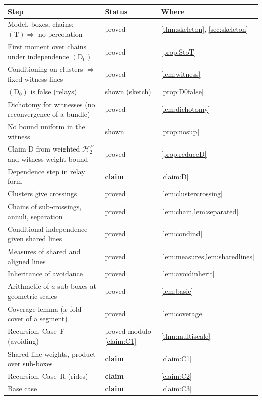 \documentclass[11pt,letterpaper]{article}
\begin{document}
\begin{center}
\renewcommand{\arraystretch}{1.25}
\begin{tabular}{@{}p{}p{}p{}@{}}
\toprule
Step & Status & Where \\
\midrule
Model, boxes, chains; $\mathrm{(T)}\Rightarrow$ no percolation & proved & \cref{thm:skeleton}, \cref{sec:skeleton} \\
First moment over chains under independence $\mathrm{(D_0)}$ & proved & \cref{prop:StoT} \\
Conditioning on clusters $\Rightarrow$ fixed witness lines & proved & \cref{lem:witness} \\
$\mathrm{(D_0)}$ is false (relays) & shown (sketch) & \cref{prop:D0false} \\
Dichotomy for witnesses (no reconvergence of a bundle) & proved & \cref{lem:dichotomy} \\
No bound uniform in the witness & shown & \cref{prop:nosup} \\
Claim D from weighted $\mathcal H_2^E$ and witness weight bound & proved & \cref{prop:reduceD} \\
Dependence step in relay form & \textbf{claim} & \cref{claim:D} \\
Clusters give crossings & proved & \cref{lem:clustercrossing} \\
Chains of sub-crossings, annuli, separation & proved & \cref{lem:chain,lem:separated} \\
Conditional independence given shared lines & proved & \cref{lem:condind} \\
Measures of shared and aligned lines & proved & \cref{lem:measures,lem:sharedlines} \\
Inheritance of avoidance & proved & \cref{lem:avoidinherit} \\
Arithmetic of $a$ sub-boxes at geometric scales & proved & \cref{lem:basic} \\
Coverage lemma ($x$-fold cover of a segment) & proved & \cref{lem:coverage} \\
Recursion, Case~F (avoiding) & proved modulo \cref{claim:C1} & \cref{thm:multiscale} \\
Shared-line weights, product over sub-boxes & \textbf{claim} & \cref{claim:C1} \\
Recursion, Case~R (rides) & \textbf{claim} & \cref{claim:C2} \\
Base case & \textbf{claim} & \cref{claim:C3} \\
\bottomrule
\end{tabular}
\end{center}
\end{document}
